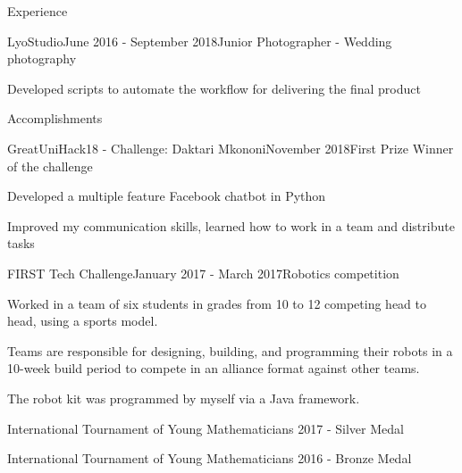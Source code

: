 \documentclass{resume} %
\newcommand{\tab}[1]{\hspace{.2667\textwidth}\rlap{#1}}
\newcommand{\itab}[1]{\hspace{0em}\rlap{#1}}
\begin{document}
\begin{rSection}{Experience}


\begin{rSubsection}{LyoStudio}{June 2016 - September 2018}{Junior Photographer - Wedding photography}{}
\item Developed scripts to automate the workflow for delivering the final product
\end{rSubsection}


\end{rSection}



\begin{rSection}{Accomplishments} \itemsep -2pt

\begin{rSubsection}{GreatUniHack18 - Challenge: Daktari Mkononi}{November 2018}{First Prize Winner of the challenge}\item
\item Developed a multiple feature Facebook chatbot in Python
\item Improved my communication skills, learned how to work in a team and distribute tasks
\end{rSubsection}

\begin{rSubsection}{FIRST Tech Challenge}{January 2017 - March 2017}{Robotics competition}{}
\item Worked in a team of six students in grades from 10 to 12 competing head to head, using a sports model.
\item Teams are responsible for designing, building, and programming their robots in a 10-week build period to compete in an alliance format against other teams.
\item The robot kit was programmed by myself via a Java framework. 
\end{rSubsection}

\item International Tournament of Young Mathematicians 2017 - Silver Medal
\item International Tournament of Young Mathematicians 2016 - Bronze Medal

\item
\end{rSection}










\end{document}
